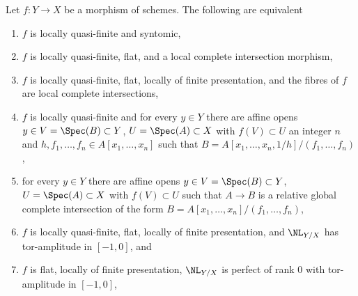 \begin{lemma}
\label{lemma-syntomic-quasi-finite}
Let $f : Y \to X$ be a morphism of schemes. The following are equivalent
\begin{enumerate}
\item $f$ is locally quasi-finite and syntomic,
\item $f$ is locally quasi-finite, flat, and a local complete intersection
morphism,
\item $f$ is locally quasi-finite, flat, locally of finite presentation,
and the fibres of $f$ are local complete intersections,
\item $f$ is locally quasi-finite and for every $y \in Y$ there are
affine opens $y \in V = \Spec(B) \subset Y$, $U = \Spec(A) \subset X$
with $f(V) \subset U$ an integer $n$ and
$h, f_1, \ldots, f_n \in A[x_1, \ldots, x_n]$ such that
$B = A[x_1, \ldots, x_n, 1/h]/(f_1, \ldots, f_n)$,
\item for every $y \in Y$ there are affine opens
$y \in V = \Spec(B) \subset Y$, $U = \Spec(A) \subset X$
with $f(V) \subset U$ such that $A \to B$ is a relative global complete
intersection of the form $B = A[x_1, \ldots, x_n]/(f_1, \ldots, f_n)$,
\item $f$ is locally quasi-finite, flat, locally of finite presentation,
and $\NL_{Y/X}$ has tor-amplitude in $[-1, 0]$, and
\item $f$ is flat, locally of finite presentation,
$\NL_{Y/X}$ is perfect of rank $0$ with tor-amplitude in $[-1, 0]$,
\end{enumerate}
\end{lemma}

